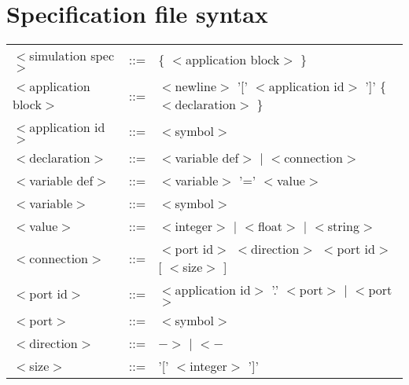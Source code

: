 \documentclass[a4paper]{report}
\begin{document}
\chapter{Specification file syntax}

\newcommand{\nt}[1]{$<$#1$>$}

\begin{tabular}{lcl}
\nt{simulation spec}   & ::= & \{ \nt{application block} \} \\
\nt{application block} & ::= & \nt{newline} '[' \nt{application id} ']' \{ \nt{declaration}
\} \\
\nt{application id}    & ::= & \nt{symbol} \\
\nt{declaration}       & ::= & \nt{variable def} $|$ \nt{connection} \\
\nt{variable def}      & ::= & \nt{variable} '=' \nt{value} \\
\nt{variable}	       & ::= & \nt{symbol} \\
\nt{value} 	       & ::= & \nt{integer} $|$ \nt{float} $|$ \nt{string} \\
\nt{connection}	       & ::= & \nt{port id} \nt{direction} \nt{port id} [ \nt{size} ] \\
\nt{port id}	       & ::= & \nt{application id} '.' \nt{port} $|$
\nt{port} \\
\nt{port}	       & ::= & \nt{symbol} \\
\nt{direction}	       & ::= & $->$ $|$ $<-$ \\
\nt{size}	       & ::= & '[' \nt{integer} ']' \\
\end{tabular}
\end{document}
